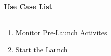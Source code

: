 \documentclass[letterpaper]{article}
\begin{document}
\noindent
\textbf{Use Case List}\\\\
\begin{enumerate}
\item Monitor Pre-Launch Activites
\item Start the Launch
\end{enumerate}
\end{document}
